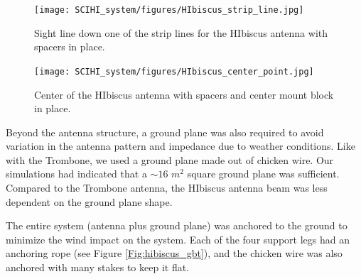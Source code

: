 \begin{figure}[htb]
\centering
\begin{minipage}[b]{0.52\textwidth}
\centering
\texttt{[image: SCIHI\_system/figures/HIbiscus\_strip\_line.jpg]}
\caption{Sight line down one of the strip lines for the HIbiscus antenna with spacers in place.}
\label{Fig:hibiscus_spacer}
\end{minipage}%
\begin{minipage}[b]{0.02\textwidth}
\hspace{1cm}
\end{minipage}%
\begin{minipage}[b]{0.42\textwidth}
\centering
\texttt{[image: SCIHI\_system/figures/HIbiscus\_center\_point.jpg]}
\caption{Center of the HIbiscus antenna with spacers and center mount block in place.}
\label{Fig:hibiscus_center}
\end{minipage}
\end{figure}

Beyond the antenna structure, a ground plane was also required to avoid variation in the antenna pattern and impedance due to weather conditions. Like with the Trombone, we used a ground plane made out of chicken wire. Our simulations had indicated that a $\sim 16$ $m^2$ square ground plane was sufficient. Compared to the Trombone antenna, the HIbiscus antenna beam was less dependent on the ground plane shape. 

The entire system (antenna plus ground plane) was anchored to the ground to minimize the wind impact on the system. Each of the four support legs had an anchoring rope (see Figure \ref{Fig:hibiscus_gbt}), and the chicken wire was also anchored with many stakes to keep it flat. 

